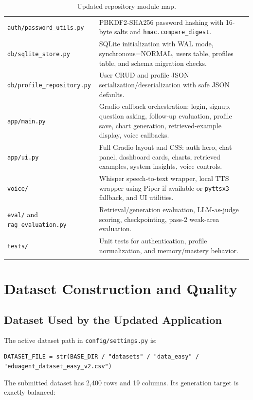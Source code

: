 \documentclass[11pt,a4paper]{article}
\begin{document}
\begin{longtable}{p{}p{}}
\texttt{auth/password\_utils.py} & PBKDF2-SHA256 password hashing with 16-byte salts and \texttt{hmac.compare\_digest}. \\
\texttt{db/sqlite\_store.py} & SQLite initialization with WAL mode, synchronous=NORMAL, users table, profiles table, and schema migration checks. \\
\texttt{db/profile\_repository.py} & User CRUD and profile JSON serialization/deserialization with safe JSON defaults. \\
\texttt{app/main.py} & Gradio callback orchestration: login, signup, question asking, follow-up evaluation, profile save, chart generation, retrieved-example display, voice callbacks. \\
\texttt{app/ui.py} & Full Gradio layout and CSS: auth hero, chat panel, dashboard cards, charts, retrieved examples, system insights, voice controls. \\
\texttt{voice/} & Whisper speech-to-text wrapper, local TTS wrapper using Piper if available or \texttt{pyttsx3} fallback, and UI utilities. \\
\texttt{eval/} and \texttt{rag\_evaluation.py} & Retrieval/generation evaluation, LLM-as-judge scoring, checkpointing, pass-2 weak-area evaluation. \\
\texttt{tests/} & Unit tests for authentication, profile normalization, and memory/mastery behavior. \\
\bottomrule
\caption{Updated repository module map.}
\end{longtable}

\section{Dataset Construction and Quality}

\subsection{Dataset Used by the Updated Application}

The active dataset path in \texttt{config/settings.py} is:

\begin{lstlisting}
DATASET_FILE = str(BASE_DIR / "datasets" / "data_easy" / "eduagent_dataset_easy_v2.csv")
\end{lstlisting}

The submitted dataset has 2,400 rows and 19 columns. Its generation target is exactly balanced:
\end{document}
